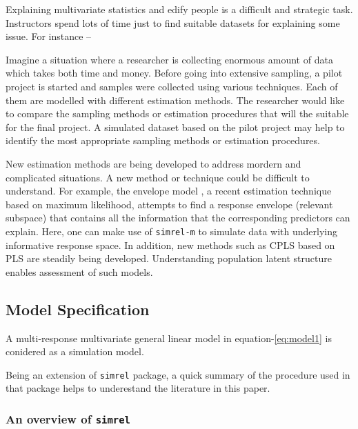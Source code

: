 \documentclass[12pt,a4paperpaper,authoryear]{elsarticle} %
\providecommand{\tightlist}{%
  \setlength{\itemsep}{0pt}\setlength{\parskip}{0pt}}
\begin{document}
\begin{description}
\tightlist
\item[\emph{Educational Purpose:}]
Explaining multivariate statistics and edify people is a difficult and
strategic task. Instructors spend lots of time just to find suitable
datasets for explaining some issue. For instance --
\item[\emph{Model and methods testing:}]
Imagine a situation where a researcher is collecting enormous amount of
data which takes both time and money. Before going into extensive
sampling, a pilot project is started and samples were collected using
various techniques. Each of them are modelled with different estimation
methods. The researcher would like to compare the sampling methods or
estimation procedures that will the suitable for the final project. A
simulated dataset based on the pilot project may help to identify the
most appropriate sampling methods or estimation procedures.
\item[\emph{Understanding and developing multivariate statistics:}]
New estimation methods are being developed to address mordern and
complicated situations. A new method or technique could be difficult to
understand. For example, the envelope model \citet{cook2015foundations},
a recent estimation technique based on maximum likelihood, attempts to
find a response envelope (relevant subspace) that contains all the
information that the corresponding predictors can explain. Here, one can
make use of \texttt{simrel-m} to simulate data with underlying
informative response space. In addition, new methods such as CPLS based
on PLS are steadily being developed. Understanding population latent
structure enables assessment of such models.
\end{description}

\subsection{Model Specification}\label{model-specification}

A multi-response multivariate general linear model in
equation-\eqref{eq:model1} is conidered as a simulation model.

Being an extension of \texttt{simrel} package, a quick summary of the
procedure used in that package helps to underestand the literature in
this paper.

\subsubsection{\texorpdfstring{An overview of
\texttt{simrel}}{An overview of simrel}}\label{an-overview-of-simrel}
\end{document}
